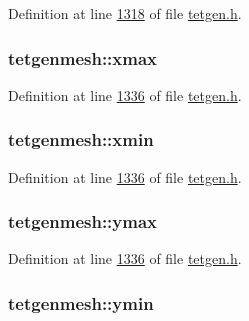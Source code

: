 Definition at line \hyperlink{tetgen_8h_source_l01318}{1318} of file \hyperlink{tetgen_8h_source}{tetgen.\+h}.

\subsubsection[{\texorpdfstring{xmax}{xmax}}]{ tetgenmesh\+::xmax}\hypertarget{classtetgenmesh_a06854628ed8614900136cae74d96925c}{}\label{classtetgenmesh_a06854628ed8614900136cae74d96925c}


Definition at line \hyperlink{tetgen_8h_source_l01336}{1336} of file \hyperlink{tetgen_8h_source}{tetgen.\+h}.

\subsubsection[{\texorpdfstring{xmin}{xmin}}]{ tetgenmesh\+::xmin}\hypertarget{classtetgenmesh_a560fe4942b4bab62881403f096532bda}{}\label{classtetgenmesh_a560fe4942b4bab62881403f096532bda}


Definition at line \hyperlink{tetgen_8h_source_l01336}{1336} of file \hyperlink{tetgen_8h_source}{tetgen.\+h}.

\subsubsection[{\texorpdfstring{ymax}{ymax}}]{ tetgenmesh\+::ymax}\hypertarget{classtetgenmesh_ac836c44e07bdd85bb4402287a22dc641}{}\label{classtetgenmesh_ac836c44e07bdd85bb4402287a22dc641}


Definition at line \hyperlink{tetgen_8h_source_l01336}{1336} of file \hyperlink{tetgen_8h_source}{tetgen.\+h}.

\subsubsection[{\texorpdfstring{ymin}{ymin}}]{ tetgenmesh\+::ymin}\hypertarget{classtetgenmesh_aeba2682688b3f46e3196b7f31007d49d}{}\label{classtetgenmesh_aeba2682688b3f46e3196b7f31007d49d}


